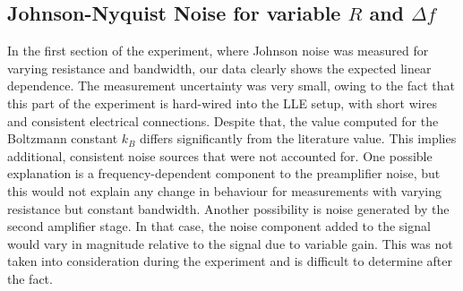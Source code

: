 \documentclass[
    parskip=half, 
    twoside=false,
    twocolumn=true,
    fontsize=11pt,
]{scrarticle}
\begin{document}
\subsection{Johnson-Nyquist Noise for variable $R$ and $\Delta f$}
In the first section of the experiment, where Johnson noise was measured for varying resistance and bandwidth, our data clearly shows the expected linear dependence. The measurement uncertainty was very small, owing to the fact that this part of the experiment is hard-wired into the LLE setup, with short wires and consistent electrical connections. Despite that, the value computed for the Boltzmann constant $k_B$ differs significantly from the literature value. This implies additional, consistent noise sources that were not accounted for. One possible explanation is a frequency-dependent component to the preamplifier noise, but this would not explain any change in behaviour for measurements with varying resistance but constant bandwidth. Another possibility is noise generated by the second amplifier stage. In that case, the noise component added to the signal would vary in magnitude relative to the signal due to variable gain. This was not taken into consideration during the experiment and is difficult to determine after the fact.
\end{document}
